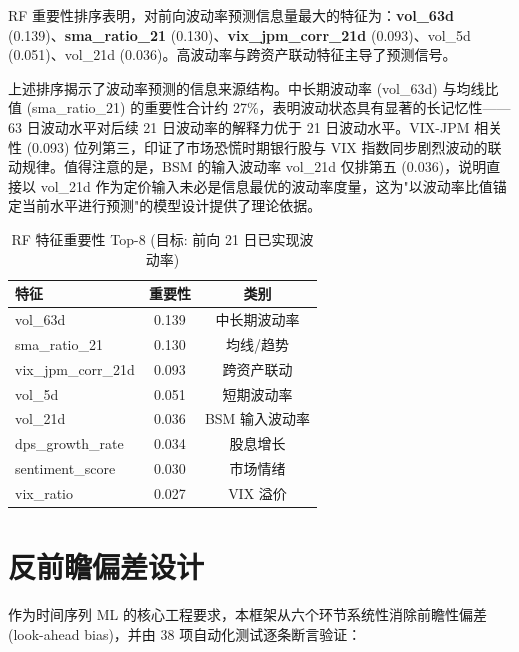 \documentclass[a4paper,11pt]{article}
\begin{document}
RF 重要性排序表明，对前向波动率预测信息量最大的特征为：\textbf{vol\_63d} (0.139)、\textbf{sma\_ratio\_21} (0.130)、\textbf{vix\_jpm\_corr\_21d} (0.093)、vol\_5d (0.051)、vol\_21d (0.036)。高波动率与跨资产联动特征主导了预测信号。

上述排序揭示了波动率预测的信息来源结构。中长期波动率 (vol\_63d) 与均线比值 (sma\_ratio\_21) 的重要性合计约 27\%，表明波动状态具有显著的长记忆性——63 日波动水平对后续 21 日波动率的解释力优于 21 日波动水平。VIX-JPM 相关性 (0.093) 位列第三，印证了市场恐慌时期银行股与 VIX 指数同步剧烈波动的联动规律。值得注意的是，BSM 的输入波动率 vol\_21d 仅排第五 (0.036)，说明直接以 vol\_21d 作为定价输入未必是信息最优的波动率度量，这为"以波动率比值锚定当前水平进行预测"的模型设计提供了理论依据。

\begin{table}[H]
\centering
\caption{RF 特征重要性 Top-8 (目标: 前向 21 日已实现波动率)}
\label{tab:feat_imp}
\begin{tabular}{lcc}
\toprule
\textbf{特征} & \textbf{重要性} & \textbf{类别} \\
\midrule
vol\_63d & 0.139 & 中长期波动率 \\
sma\_ratio\_21 & 0.130 & 均线/趋势 \\
vix\_jpm\_corr\_21d & 0.093 & 跨资产联动 \\
vol\_5d & 0.051 & 短期波动率 \\
vol\_21d & 0.036 & BSM 输入波动率 \\
dps\_growth\_rate & 0.034 & 股息增长 \\
sentiment\_score & 0.030 & 市场情绪 \\
vix\_ratio & 0.027 & VIX 溢价 \\
\bottomrule
\end{tabular}
\end{table}

\section{反前瞻偏差设计}

作为时间序列 ML 的核心工程要求，本框架从六个环节系统性消除前瞻性偏差 (look-ahead bias)，并由 38 项自动化测试逐条断言验证：
\end{document}
